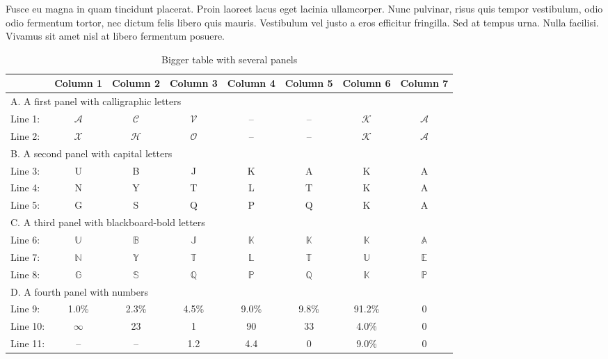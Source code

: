 \documentclass[letterpaper,11pt,leqno]{article}
\begin{document}
Fusce eu magna in quam tincidunt placerat. Proin laoreet lacus eget lacinia ullamcorper. Nunc pulvinar, risus quis tempor vestibulum, odio odio fermentum tortor, nec dictum felis libero quis mauris. Vestibulum vel justo a eros efficitur fringilla. Sed at tempus urna. Nulla facilisi. Vivamus sit amet nisl at libero fermentum posuere.


\begin{table}[t]
\caption{Bigger table with several panels}
\begin{tabular*}{\textwidth}[]{p{2cm}@{\extracolsep\fill}ccccccc}
\toprule
    & Column 1 &  Column 2 &  Column 3  &  Column 4 &  Column 5 &  Column 6 &  Column 7 \\
\midrule
\multicolumn{8}{l}{A. A first panel with calligraphic letters}\\
Line 1: & $\mathcal{A}$ & $\mathcal{C}$ & $\mathcal{V}$  & -- & -- & $\mathcal{K}$ & $\mathcal{A}$\\
Line 2: & $\mathcal{X}$ &  $\mathcal{H}$ & $\mathcal{O}$  & -- & -- & $\mathcal{K}$ & $\mathcal{A}$  \\
\midrule
\multicolumn{8}{l}{B. A second panel with capital letters}\\
Line 3: & U & B & J  & K & A & K & A\\
Line 4: & N & Y & T  & L & T & K & A\\
Line 5: & G & S & Q  & P & Q & K & A\\
\midrule
\multicolumn{8}{l}{C. A third panel with blackboard-bold letters}\\
Line 6: & $\mathbb{U}$ & $\mathbb{B}$ & $\mathbb{J}$  & $\mathbb{K}$ & $\mathbb{K}$ & $\mathbb{K}$ & $\mathbb{A}$\\
Line 7: & $\mathbb{N}$ & $\mathbb{Y}$ & $\mathbb{T}$  & $\mathbb{L}$ & $\mathbb{T}$ & $\mathbb{U}$ & $\mathbb{E}$\\
Line 8: & $\mathbb{G}$ & $\mathbb{S}$ & $\mathbb{Q}$  & $\mathbb{P}$ & $\mathbb{Q}$ & $\mathbb{K}$ & $\mathbb{P}$\\
\midrule
\multicolumn{8}{l}{D. A fourth panel with numbers}\\
Line 9: & 1.0\% & 2.3\% & 4.5\%  & 9.0\% & 9.8\% & 91.2\% & 0\\
Line 10: & $\infty$ & 23 & 1 & 90 & 33 & 4.0\% & 0\\
Line 11: & -- & -- & 1.2  & 4.4 & 0 & 9.0\% & 0\\
\bottomrule
\end{tabular*}
\label{t:table2}\end{table}
\end{document}

